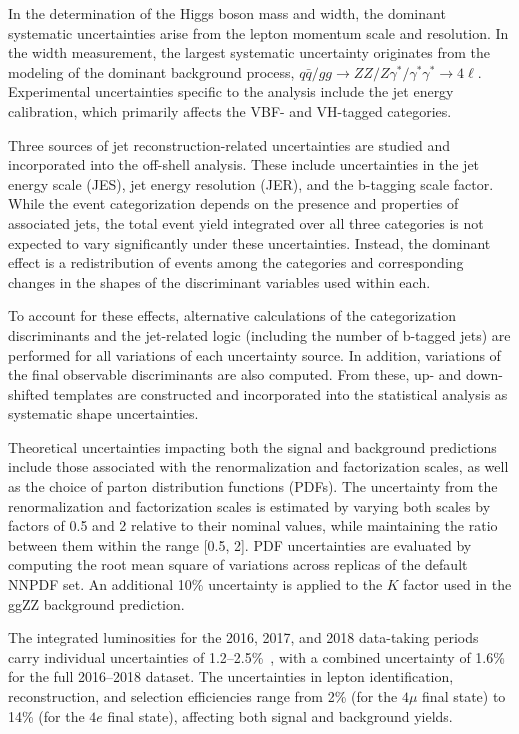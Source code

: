 In the \onshell determination of the Higgs boson mass and width, the dominant systematic uncertainties arise from the lepton momentum scale and resolution. In the \offshell width measurement, the largest systematic uncertainty originates from the modeling of the dominant background process, $q\bar{q}/gg \to ZZ/Z\gamma^*/\gamma^*\gamma^* \to 4\ell$. Experimental uncertainties specific to the \offshell analysis include the jet energy calibration, which primarily affects the VBF- and VH-tagged categories.

Three sources of jet reconstruction-related uncertainties are studied and incorporated into the off-shell analysis. These include uncertainties in the jet energy scale (JES), jet energy resolution (JER), and the b-tagging scale factor. While the event categorization depends on the presence and properties of associated jets, the total event yield integrated over all three categories is not expected to vary significantly under these uncertainties. Instead, the dominant effect is a redistribution of events among the categories and corresponding changes in the shapes of the discriminant variables used within each.

To account for these effects, alternative calculations of the categorization discriminants and the jet-related logic (including the number of b-tagged jets) are performed for all variations of each uncertainty source. In addition, variations of the final observable discriminants are also computed. From these, up- and down-shifted templates are constructed and incorporated into the statistical analysis as systematic shape uncertainties.

Theoretical uncertainties impacting both the signal and background predictions include those associated with the renormalization and factorization scales, as well as the choice of parton distribution functions (PDFs). The uncertainty from the renormalization and factorization scales is estimated by varying both scales by factors of 0.5 and 2 relative to their nominal values, while maintaining the ratio between them within the range [0.5, 2]. PDF uncertainties are evaluated by computing the root mean square of variations across replicas of the default NNPDF set. An additional 10\% uncertainty is applied to the $K$ factor used in the ggZZ background prediction.

The integrated luminosities for the 2016, 2017, and 2018 data-taking periods carry individual uncertainties of 1.2--2.5\%~\cite{CMS-LUM-17-003,CMS-PAS-LUM-17-004,CMS-PAS-LUM-18-002}, with a combined uncertainty of 1.6\% for the full 2016--2018 dataset. The uncertainties in lepton identification, reconstruction, and selection efficiencies range from 2\% (for the $4\mu$ final state) to 14\% (for the $4e$ final state), affecting both signal and background yields.

